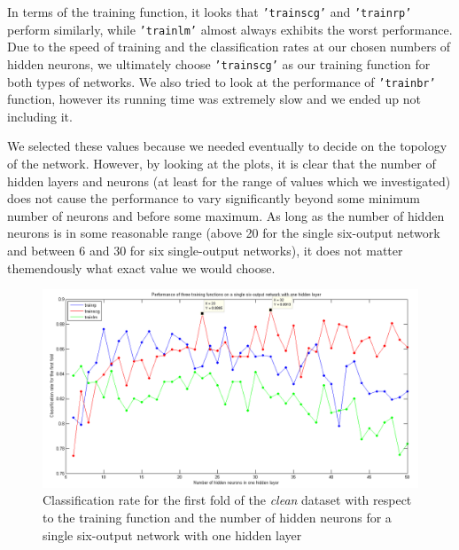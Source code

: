 \documentclass[a4paper]{article}
\begin{document}
In terms of the training function, it looks that \texttt{'trainscg'} and \texttt{'trainrp'} perform similarly, while \texttt{'trainlm'} almost always exhibits the worst performance. Due to the speed of training and the classification rates at our chosen numbers of hidden neurons, we ultimately choose \texttt{'trainscg'} as our training function for both types of networks. We also tried to look at the performance of \texttt{'trainbr'} function, however its running time was extremely slow and we ended up not including it. \medskip

We selected these values because we needed eventually to decide on the topology of the network. However, by looking at the plots, it is clear that the number of hidden layers and neurons (at least for the range of values which we investigated) does not cause the performance to vary significantly beyond some minimum number of neurons and before some maximum. As long as the number of hidden neurons is in some reasonable range (above 20 for the single six-output network and between 6 and 30 for six single-output networks), it does not matter themendously what exact value we would choose.

\begin{figure}[H]
\center
\includegraphics[width=1\columnwidth]{multiOutput1layer}
\caption{Classification rate for the first fold of the \emph{clean} dataset with respect to the training function and the number of hidden neurons for a single six-output network with one hidden layer}
\label{multiOutput1layer}
\end{figure}
\end{document}
